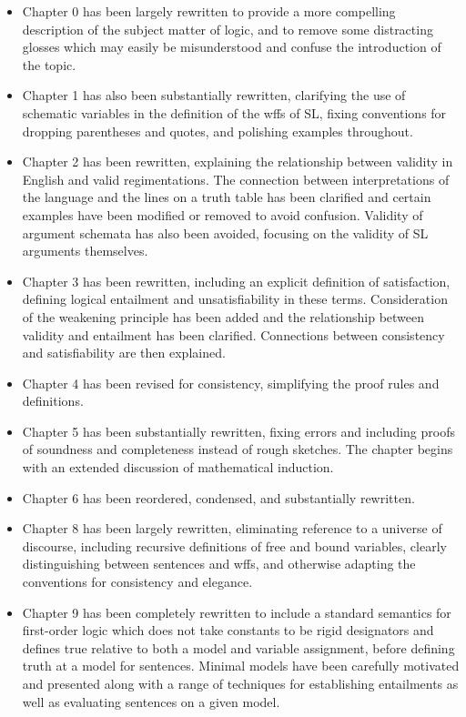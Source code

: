 \begin{itemize}
  \item Chapter 0 has been largely rewritten to provide a more compelling description of the subject matter of logic, and to remove some distracting glosses which may easily be misunderstood and confuse the introduction of the topic.
  \item Chapter 1 has also been substantially rewritten, clarifying the use of schematic variables in the definition of the wffs of SL, fixing conventions for dropping parentheses and quotes, and polishing examples throughout.
  \item Chapter 2 has been rewritten, explaining the relationship between validity in English and valid regimentations. The connection between interpretations of the language and the lines on a truth table has been clarified and certain examples have been modified or removed to avoid confusion. Validity of argument schemata has also been avoided, focusing on the validity of SL arguments themselves.
  \item Chapter 3 has been rewritten, including an explicit definition of satisfaction, defining logical entailment and unsatisfiability in these terms. Consideration of the weakening principle has been added and the relationship between validity and entailment has been clarified. Connections between consistency and satisfiability are then explained.
  \item Chapter 4 has been revised for consistency, simplifying the proof rules and definitions.
  \item Chapter 5 has been substantially rewritten, fixing errors and including proofs of soundness and completeness instead of rough sketches. The chapter begins with an extended discussion of mathematical induction.
  \item Chapter 6 has been reordered, condensed, and substantially rewritten.
  \item Chapter 8 has been largely rewritten, eliminating reference to a universe of discourse, including recursive definitions of free and bound variables, clearly distinguishing between sentences and wffs, and otherwise adapting the conventions for consistency and elegance.
  \item Chapter 9 has been completely rewritten to include a standard semantics for first-order logic which does not take constants to be rigid designators and defines true relative to both a model and variable assignment, before defining truth at a model for sentences. Minimal models have been carefully motivated and presented along with a range of techniques for establishing entailments as well as evaluating sentences on a given model.

\end{itemize}
